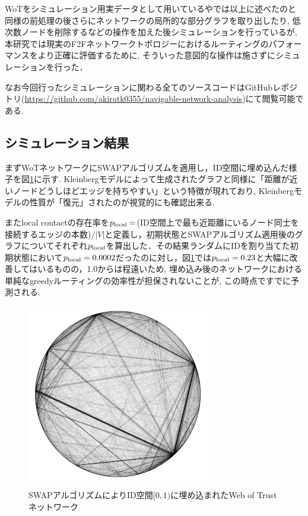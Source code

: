 \documentclass[technicalreport]{./ieicej-v3.0/UTF/ieicej}
\begin{document}
 WoTをシミュレーション用実データとして用いている\cite{sandberg2006distributed}や\cite{clarke2010private}では以上に述べたのと同様の前処理の後さらにネットワークの局所的な部分グラフを取り出したり, 低次数ノードを削除するなどの操作を加えた後シミュレーションを行っているが, 本研究では現実のF2Fネットワークトポロジーにおけるルーティングのパフォーマンスをより正確に評価するために, そういった意図的な操作は施さずにシミュレーションを行った．

なお今回行ったシミュレーションに関わる全てのソースコードはGitHubレポジトリ(\url{https://github.com/akiratk0355/navigable-network-analysis})にて閲覧可能である.

  \subsection{シミュレーション結果}
   まずWoTネットワークにSWAPアルゴリズムを適用し，ID空間に埋め込んだ様子を図\ref{fig:wot_emb}に示す. Kleinbergモデルによって生成されたグラフと同様に「距離が近いノードどうしほどエッジを持ちやすい」という特徴が現れており, Kleinbergモデルの性質が「復元」されたのが視覚的にも確認出来る.

   またlocal contactの存在率を$p_{\rm{local}}=$(ID空間上で最も近距離にいるノード同士を接続するエッジの本数)$/|V|$と定義し，初期状態とSWAPアルゴリズム適用後のグラフについてそれぞれ$p_{\rm{local}}$を算出した．その結果ランダムにIDを割り当てた初期状態において$p_{\rm{local}}=0.0002$だったのに対し，図\ref{fig:wot_emb}では$p_{\rm{local}} = 0.23$と大幅に改善してはいるものの，1.0からは程遠いため, 埋め込み後のネットワークにおける単純なgreedyルーティングの効率性が担保されないことが, この時点ですでに予測される.

   \begin{figure}[htb]
    \includegraphics[width=80mm]{../fig/wot_emb_sandberg_ccs.png}
    \caption{SWAPアルゴリズムによりID空間$[0,1)$に埋め込まれたWeb of Trustネットワーク}
    \label{fig:wot_emb}
   \end{figure}
\end{document}

